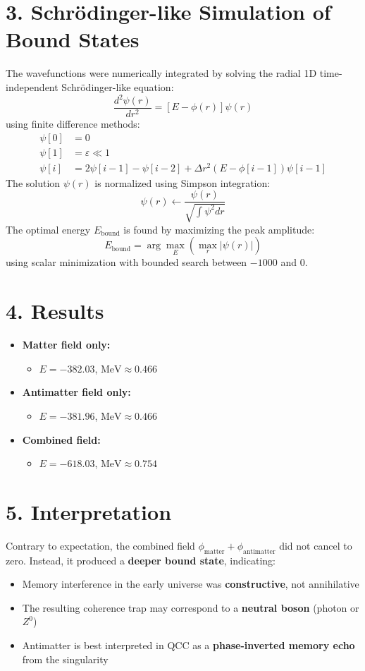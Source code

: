 \documentclass[12pt]{article}
\begin{document}
\section*{3. Schr\"odinger-like Simulation of Bound States}
The wavefunctions were numerically integrated by solving the radial 1D time-independent Schr\"odinger-like equation:
\[
\frac{d^2 \psi(r)}{dr^2} = [E - \phi(r)] \psi(r)
\]
using finite difference methods:
\begin{align*}
\psi[0] &= 0 \\
\psi[1] &= \varepsilon \ll 1 \\
\psi[i] &= 2\psi[i-1] - \psi[i-2] + \Delta r^2 (E - \phi[i-1]) \psi[i-1]
\end{align*}
The solution $\psi(r)$ is normalized using Simpson integration:
\[
\psi(r) \leftarrow \frac{\psi(r)}{\sqrt{\int \psi^2 dr}}
\]
The optimal energy $E_\text{bound}$ is found by maximizing the peak amplitude:
\[
E_\text{bound} = \arg\max_E \left( \max_r |\psi(r)| \right)
\]
using scalar minimization with bounded search between $-1000$ and $0$.

\section*{4. Results}
\begin{itemize}
  \item \textbf{Matter field only:}
    \begin{itemize}
      \item $E = -382.03$, \quad $\text{MeV} \approx 0.466$
    \end{itemize}
  \item \textbf{Antimatter field only:}
    \begin{itemize}
      \item $E = -381.96$, \quad $\text{MeV} \approx 0.466$
    \end{itemize}
  \item \textbf{Combined field:}
    \begin{itemize}
      \item $E = -618.03$, \quad $\text{MeV} \approx 0.754$
    \end{itemize}
\end{itemize}

\section*{5. Interpretation}
Contrary to expectation, the combined field $\phi_\text{matter} + \phi_\text{antimatter}$ did not cancel to zero. Instead, it produced a \textbf{deeper bound state}, indicating:
\begin{itemize}
  \item Memory interference in the early universe was \textbf{constructive}, not annihilative
  \item The resulting coherence trap may correspond to a \textbf{neutral boson} (photon or $Z^0$)
  \item Antimatter is best interpreted in QCC as a \textbf{phase-inverted memory echo} from the singularity
\end{itemize}
\end{document}

